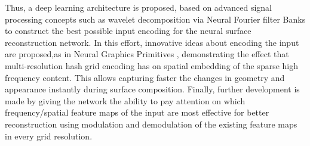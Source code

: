     Thus, a deep learning architecture is proposed, based on advanced signal processing concepts such as wavelet decomposition via Neural Fourier filter Banks \cite{wu2023neural} to construct the best possible input encoding for the neural surface reconstruction network. In this effort, innovative ideas about encoding the input are proposed,as in Neural Graphics Primitives \cite{mueller2022instant}, demonstrating the effect that multi-resolution hash grid encoding has on spatial embedding of the sparse high frequency content. This allows capturing faster the changes in geometry and appearance instantly during surface composition. Finally, further development is made by giving the network the ability  to pay attention on which frequency/spatial feature maps of the input are most effective for better reconstruction using modulation and demodulation of the existing feature maps in every grid resolution.


\clearpage